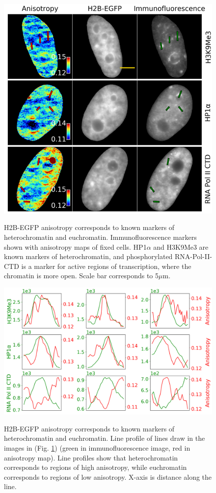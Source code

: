 \begin{figure}[!hbtp]
    {\hfill\includegraphics[trim=0 5 0 30, clip,width=0.8\linewidth]{figures/1.png}\hspace*{\fill}}
    \caption{H2B-EGFP anisotropy corresponds to known markers of heterochromatin and euchromatin. Immunofluorescence markers shown with anisotropy maps of fixed cells. HP1$\alpha$ and H3K9Me3 are known markers of heterochromatin, and phosphorylated RNA-Pol-II-CTD is a marker for active regions of transcription, where the chromatin is more open. Scale bar corresponds to 5$\mu$m.}
    {\label{fig:an_verify}}
\end{figure}

\begin{figure}[!hbtp]
    {\hfill\includegraphics[clip,width=0.8\linewidth]{figures/2.png}\hspace*{\fill}}
    \caption{H2B-EGFP anisotropy corresponds to known markers of heterochromatin and euchromatin. Line profile of lines draw in the images in (Fig. \ref{fig:an_verify}) (green in immunofluorescence image, red in anisotropy map). Line profiles show that heterochromatin corresponds to regions of high anisotropy, while euchromatin corresponds to regions of low anisotropy. X-axis is distance along the line.}
    {\label{fig:an_verify_line}}
\end{figure}


